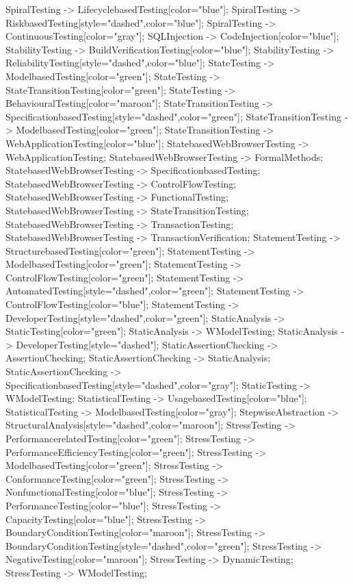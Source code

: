\documentclass{article}
\begin{document}
{SpiralTesting -> LifecyclebasedTesting[color="blue"];
SpiralTesting -> RiskbasedTesting[style="dashed",color="blue"];
SpiralTesting -> ContinuousTesting[color="gray"];
SQLInjection -> CodeInjection[color="blue"];
StabilityTesting -> BuildVerificationTesting[color="blue"];
StabilityTesting -> ReliabilityTesting[style="dashed",color="blue"];
StateTesting -> ModelbasedTesting[color="green"];
StateTesting -> StateTransitionTesting[color="green"];
StateTesting -> BehaviouralTesting[color="maroon"];
StateTransitionTesting -> SpecificationbasedTesting[style="dashed",color="green"];
StateTransitionTesting -> ModelbasedTesting[color="green"];
StateTransitionTesting -> WebApplicationTesting[color="blue"];
StatebasedWebBrowserTesting -> WebApplicationTesting;
StatebasedWebBrowserTesting -> FormalMethods;
StatebasedWebBrowserTesting -> SpecificationbasedTesting;
StatebasedWebBrowserTesting -> ControlFlowTesting;
StatebasedWebBrowserTesting -> FunctionalTesting;
StatebasedWebBrowserTesting -> StateTransitionTesting;
StatebasedWebBrowserTesting -> TransactionTesting;
StatebasedWebBrowserTesting -> TransactionVerification;
StatementTesting -> StructurebasedTesting[color="green"];
StatementTesting -> ModelbasedTesting[color="green"];
StatementTesting -> ControlFlowTesting[color="green"];
StatementTesting -> AutomatedTesting[style="dashed",color="green"];
StatementTesting -> ControlFlowTesting[color="blue"];
StatementTesting -> DeveloperTesting[style="dashed",color="green"];
StaticAnalysis -> StaticTesting[color="green"];
StaticAnalysis -> WModelTesting;
StaticAnalysis -> DeveloperTesting[style="dashed"];
StaticAssertionChecking -> AssertionChecking;
StaticAssertionChecking -> StaticAnalysis;
StaticAssertionChecking -> SpecificationbasedTesting[style="dashed",color="gray"];
StaticTesting -> WModelTesting;
StatisticalTesting -> UsagebasedTesting[color="blue"];
StatisticalTesting -> ModelbasedTesting[color="gray"];
StepwiseAbstraction -> StructuralAnalysis[style="dashed",color="maroon"];
StressTesting -> PerformancerelatedTesting[color="green"];
StressTesting -> PerformanceEfficiencyTesting[color="green"];
StressTesting -> ModelbasedTesting[color="green"];
StressTesting -> ConformanceTesting[color="green"];
StressTesting -> NonfunctionalTesting[color="blue"];
StressTesting -> PerformanceTesting[color="blue"];
StressTesting -> CapacityTesting[color="blue"];
StressTesting -> BoundaryConditionTesting[color="maroon"];
StressTesting -> BoundaryConditionTesting[style="dashed",color="green"];
StressTesting -> NegativeTesting[color="maroon"];
StressTesting -> DynamicTesting;
StressTesting -> WModelTesting;
}
\end{document}
